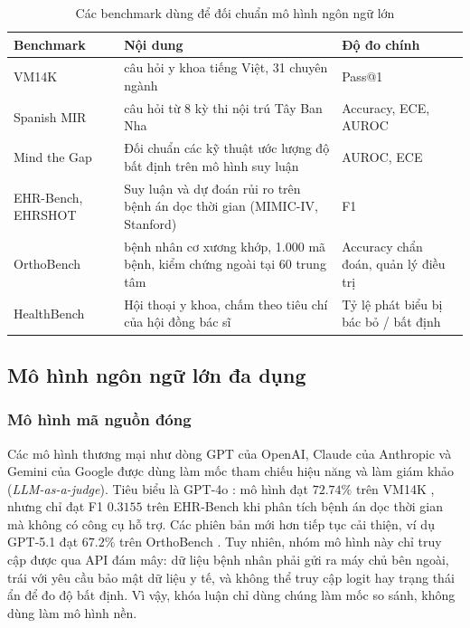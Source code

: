 \begin{table}[H]
\begin{singlespace}
\centering
\fontsize{8pt}{10pt}\selectfont
\setlength{\tabcolsep}{3.5pt}
\renewcommand{\arraystretch}{1.1}
\begin{tabularx}{\textwidth}{|>{\raggedright\arraybackslash}p{3.2cm}|>{\raggedright\arraybackslash}X|>{\raggedright\arraybackslash}p{3.6cm}|}
\hline
\textbf{Benchmark} & \textbf{Nội dung} & \textbf{Độ đo chính} \\
\hline
VM14K \cite{vm14k_2025} & 14.000 câu hỏi y khoa tiếng Việt, 31 chuyên ngành & Pass@1 \\
\hline
Spanish MIR \cite{spanish_mir_2026} & 1.552 câu hỏi từ 8 kỳ thi nội trú Tây Ban Nha & Accuracy, ECE, AUROC \\
\hline
Mind the Gap \cite{mind_the_gap_2026} & Đối chuẩn các kỹ thuật ước lượng độ bất định trên mô hình suy luận & AUROC, ECE \\
\hline
EHR-Bench, EHRSHOT & Suy luận và dự đoán rủi ro trên bệnh án dọc thời gian (MIMIC-IV, Stanford) & F1 \\
\hline
OrthoBench \cite{orthopilot_2026} & 5.905 bệnh nhân cơ xương khớp, 1.000 mã bệnh, kiểm chứng ngoài tại 60 trung tâm & Accuracy chẩn đoán, quản lý điều trị \\
\hline
HealthBench & Hội thoại y khoa, chấm theo tiêu chí của hội đồng bác sĩ & Tỷ lệ phát biểu bị bác bỏ / bất định \\
\hline
\end{tabularx}
\caption{Các benchmark dùng để đối chuẩn mô hình ngôn ngữ lớn}
\label{tab:llm_benchmarks}
\end{singlespace}
\end{table}

\subsection{Mô hình ngôn ngữ lớn đa dụng}

\subsubsection{Mô hình mã nguồn đóng}
Các mô hình thương mại như dòng GPT của OpenAI, Claude của Anthropic và Gemini của Google được dùng làm mốc tham chiếu hiệu năng và làm giám khảo (\emph{LLM-as-a-judge}). Tiêu biểu là GPT-4o \cite{achiam2023gpt4}: mô hình đạt $72.74\%$ trên VM14K \cite{vm14k_2025}, nhưng chỉ đạt F1 $0.3155$ trên EHR-Bench khi phân tích bệnh án dọc thời gian mà không có công cụ hỗ trợ. Các phiên bản mới hơn tiếp tục cải thiện, ví dụ GPT-5.1 đạt $67.2\%$ trên OrthoBench \cite{orthopilot_2026}. Tuy nhiên, nhóm mô hình này chỉ truy cập được qua API đám mây: dữ liệu bệnh nhân phải gửi ra máy chủ bên ngoài, trái với yêu cầu bảo mật dữ liệu y tế, và không thể truy cập logit hay trạng thái ẩn để đo độ bất định. Vì vậy, khóa luận chỉ dùng chúng làm mốc so sánh, không dùng làm mô hình nền.

